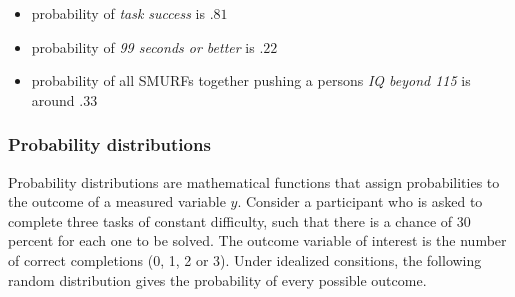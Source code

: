 \documentclass[]{svmono}
\newenvironment{Shaded}{\begin{snugshade}}{\end{snugshade}}
\newcommand{\KeywordTok}[1]{\textcolor[rgb]{0.13,0.29,0.53}{\textbf{#1}}}
\newcommand{\DataTypeTok}[1]{\textcolor[rgb]{0.13,0.29,0.53}{#1}}
\newcommand{\DecValTok}[1]{\textcolor[rgb]{0.00,0.00,0.81}{#1}}
\newcommand{\FloatTok}[1]{\textcolor[rgb]{0.00,0.00,0.81}{#1}}
\newcommand{\StringTok}[1]{\textcolor[rgb]{0.31,0.60,0.02}{#1}}
\newcommand{\OperatorTok}[1]{\textcolor[rgb]{0.81,0.36,0.00}{\textbf{#1}}}
\newcommand{\NormalTok}[1]{#1}
\providecommand{\tightlist}{%
  \setlength{\itemsep}{0pt}\setlength{\parskip}{0pt}}
\begin{document}
\begin{itemize}
\tightlist
\item
  probability of \emph{task success} is \(.81\)
\item
  probability of \emph{99 seconds or better} is \(.22\)
\item
  probability of all SMURFs together pushing a persons \emph{IQ beyond
  115} is around \(.33\)
\end{itemize}

\subsubsection{Probability
distributions}\label{probability-distributions}

Probability distributions are mathematical functions that assign
probabilities to the outcome of a measured variable \(y\). Consider a
participant who is asked to complete three tasks of constant difficulty,
such that there is a chance of \(30\) percent for each one to be solved.
The outcome variable of interest is the number of correct completions
(0, 1, 2 or 3). Under idealized consitions, the following random
distribution gives the probability of every possible outcome.

\begin{Shaded}
\end{Shaded}
\end{document}
